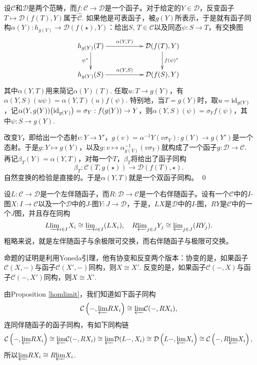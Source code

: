 \proof 
	设$\mathcal{C}$和$\mathcal{D}$是两个范畴，而$f:\mathcal{C}\to \mathcal{D}$是一个函子。对于给定的$Y\in\mathcal{D}$，反变函子$T\mapsto {\mathcal{D}}(f(T),Y)$属于$\hat{\mathcal{C}}$. 如果他是可表函子，被$g(Y)$所表示，于是就有函子同构$\alpha(Y):h_{g(Y)}\to {\mathcal{D}}(f(\star),Y)$：给出$S$, $T\in \mathcal{C}$以及同态$\psi:S\to T$，有交换图
	\[
	\begin{xy}
		\xymatrix{
			h_{g(Y)}(T)\ar[rr]^-{\alpha(Y,T)} \ar[d]_{\psi^*}&&{\mathcal{D}}(f(T),Y) \ar[d]^{f(\psi)^*}\\
			h_{g(Y)}(S)\ar[rr]^-{\alpha(Y,S)}&&{\mathcal{D}}(f(S),Y)
		}
	\end{xy}
	\]
	其中$\alpha(Y,T)$用来简记$\alpha(Y)(T)$. 任取$u:T\to {g(Y)}$，有$\alpha(Y,S)(u\psi)=\alpha(Y,T)(u)f(\psi)$. 特别地，当$T=g(Y)$时，取$u=\operatorname{id}_{g(Y)}$，记$\alpha(Y,g(Y))\bigl(\operatorname{id}_{g(Y)}\bigr)=\sigma_Y:f(g(Y))\to Y$，则$\alpha(Y,S)(\psi)=\sigma_Y f(\psi)$，其中$\psi:S\to g(Y)$.

	改变$Y$，即给出一个态射$v:Y\to Y'$，$g(v)=\alpha^{-1}{Y}\left(v\sigma_Y\right):g(Y)\to g(Y')$是一个态射。于是$g:Y\mapsto g(Y)$，以及$g:v\mapsto \alpha^{-1}_{g(Y)}\left(v\sigma_Y\right)$就构成了一个函子$g:\mathcal{D}\to \mathcal{C}$. 再记$\beta_T(Y)=\alpha(Y,T)$，对每一个$T$，$\beta_T$将给出了函子同构
	\[
		\beta_T:\mathcal{C}(T,g(\star))\to \mathcal{D}(f(T),\star).
	\]
	自然变换的检验是直接的。于是$\alpha(Y,T)$就是一个双函子同构。
\qed

\pro 设$L:\mathcal{C}\to \mathcal{D}$是一个左伴随函子，而$R:\mathcal{D}\to \mathcal{C}$是一个右伴随函子。设有一个$\mathcal{C}$中的$I$-图$X:I\to \mathcal{C}$以及一个$\mathcal{D}$中的$J$-图$Y:J\to \mathcal{D}$，于是，$LX$是$\mathcal{D}$中的$I$-图，$RY$是$\mathcal{C}$中的一个$J$图，并且存在同构
\[
	L{\varinjlim}_{i\in I} X_i\cong {\varinjlim}_{i\in I} (LX_i),\quad
	R{\varprojlim}_{j\in J} Y_j\cong {\varprojlim}_{j\in J} (RY_j).
\]
粗略来说，就是左伴随函子与余极限可交换，而右伴随函子与极限可交换。

\proof
	命题的证明是利用Yoneda引理，他有协变和反变两个版本：协变的是，如果函子$\mathcal{C}(X,-)$与函子$\mathcal{C}(X',-)$同构，则$X\cong X'$. 反变的是，如果函子$\mathcal{C}(-,X)$与函子$\mathcal{C}(-,X')$同构，则$X\cong X'$.

	由Proposition \eqref{homlimit}，我们知道如下函子同构
	\[
	\mathcal{C}\left(-,{\varprojlim} RX_i\right)\cong {\varprojlim} \mathcal{C}(-,RX_i),
	\]
	连同伴随函子的函子同构，有如下同构链
	\[
	\mathcal{C}\left(-,{\varprojlim} RX_i\right)\cong {\varprojlim} \mathcal{C}(-,RX_i)\cong {\varprojlim} \mathcal{D}(L-,X_i)\cong \mathcal{D}\left(L-,{\varprojlim} X_i\right)\cong \mathcal{C}\left(-,R{\varprojlim} X_i\right),
	\]
	所以${\varprojlim} RX_i\cong R{\varprojlim} X_i$.

